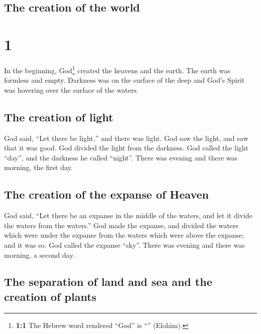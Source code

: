 \hypertarget{the-creation-of-the-world}{%
\subsection{The creation of the world}\label{the-creation-of-the-world}}

\hypertarget{section}{%
\section{1}\label{section}}

 In the beginning, God\footnote{\textbf{1:1} The Hebrew
  word rendered ``God'' is ``'' (Elohim).} created the
heavens and the earth.  The earth was formless and empty.
Darkness was on the surface of the deep and God's Spirit was hovering
over the surface of the waters.

\hypertarget{the-creation-of-light}{%
\subsection{The creation of light}\label{the-creation-of-light}}

 God said, ``Let there be light,'' and there was light.
 God saw the light, and saw that it was good. God divided
the light from the darkness.  God called the light
``day'', and the darkness he called ``night''. There was evening and
there was morning, the first day.

\hypertarget{the-creation-of-the-expanse-of-heaven}{%
\subsection{The creation of the expanse of
Heaven}\label{the-creation-of-the-expanse-of-heaven}}

 God said, ``Let there be an expanse in the middle of the
waters, and let it divide the waters from the waters.'' 
God made the expanse, and divided the waters which were under the
expanse from the waters which were above the expanse; and it was so.
 God called the expanse ``sky''. There was evening and
there was morning, a second day.

\hypertarget{the-separation-of-land-and-sea-and-the-creation-of-plants}{%
\subsection{The separation of land and sea and the creation of
plants}\label{the-separation-of-land-and-sea-and-the-creation-of-plants}}


